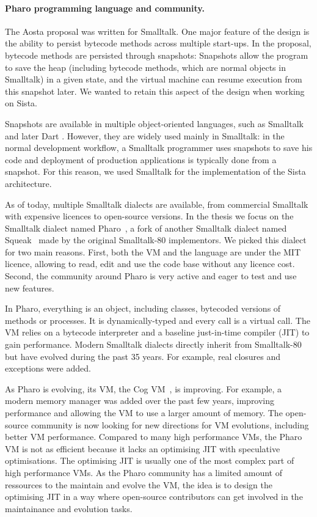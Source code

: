 \documentclass[a4paper,12pt,twoside]{../includes/ThesisStyle}
\begin{document}
\paragraph{Pharo programming language and community.}

The Aosta proposal was written for Smalltalk. One major feature of the design is the ability to persist bytecode methods across multiple start-ups. In the proposal, bytecode methods are persisted through snapshots: Snapshots allow the program to save the heap (including bytecode methods, which are normal objects in Smalltalk) in a given state, and the virtual machine can resume execution from this snapshot later. We wanted to retain this aspect of the design when working on Sista.

Snapshots are available in multiple object-oriented languages, such as Smalltalk and later Dart \cite{Anna13a}. However, they are widely used mainly in Smalltalk: in the normal development workflow, a Smalltalk programmer uses snapshots to save his code and deployment of production applications is typically done from a snapshot. For this reason, we used Smalltalk for the implementation of the Sista architecture.

As of today, multiple Smalltalk dialects are available, from commercial Smalltalk with expensive licences to open-source versions. In the thesis we focus on the Smalltalk dialect named Pharo~\cite{Blac09a}, a fork of another Smalltalk dialect named Squeak~\cite{Blac07a} made by the original Smalltalk-80 implementors. We picked this dialect for two main reasons. First, both the VM and the language are under the MIT licence, allowing to read, edit and use the code base without any licence cost. Second, the community around Pharo is very active and eager to test and use new features.

In Pharo, everything is an object, including classes, bytecoded versions of methods or processes. It is dynamically-typed and every call is a virtual call. The VM relies on a bytecode interpreter and a baseline just-in-time compiler (JIT) to gain performance. Modern Smalltalk dialects directly inherit from Smalltalk-80~\cite{Gold83a} but have evolved during the past 35 years. For example, real closures and exceptions were added.

As Pharo is evolving, its VM, the Cog VM~\cite{Mira08a}, is improving. For example, a modern memory manager was added over the past few years, improving performance and allowing the VM to use a larger amount of memory. The open-source community is now looking for new directions for VM evolutions, including better VM performance. Compared to many high performance VMs, the Pharo VM is not as efficient because it lacks an optimising JIT with speculative optimisations. The optimising JIT is usually one of the most complex part of high performance VMs. As the Pharo community has a limited amount of ressources to the maintain and evolve the VM, the idea is to design the optimising JIT in a way where open-source contributors can get involved in the maintainance and evolution tasks.
\end{document}
